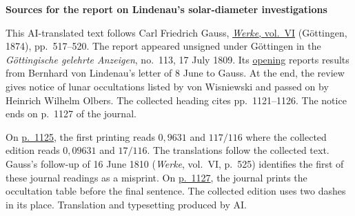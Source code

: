 \clearpage\thispagestyle{empty}
\begin{center}\textbf{Sources for the report on Lindenau’s solar-diameter investigations}\end{center}
\noindent This AI-translated text follows Carl Friedrich Gauss, \href{https://gdz.sub.uni-goettingen.de/id/PPN236007467}{\emph{Werke}, vol.~VI} (Göttingen, 1874), pp.~517–520. The report appeared unsigned under Göttingen in the \emph{Göttingische gelehrte Anzeigen}, no.~113, 17 July 1809. Its \href{https://images.p.sub.uni-goettingen.de/iiif/image/gdz:PPN319721507_1809:00001125/full/1650,/0/default.jpg}{opening} reports results from Bernhard von Lindenau’s letter of 8 June to Gauss. At the end, the review gives notice of lunar occultations listed by von Wisniewski and passed on by Heinrich Wilhelm Olbers. The collected heading cites pp.~1121–1126. The notice ends on p.~1127 of the journal.
\par\smallskip\noindent On \href{https://images.p.sub.uni-goettingen.de/iiif/image/gdz:PPN319721507_1809:00001129/full/1650,/0/default.jpg}{p.~1125}, the first printing reads $0{,}9631$ and $117/116$ where the collected edition reads $0{,}09631$ and $17/116$. The translations follow the collected text. Gauss’s follow-up of 16 June 1810 (\emph{Werke}, vol.~VI, p.~525) identifies the first of these journal readings as a misprint. On \href{https://images.p.sub.uni-goettingen.de/iiif/image/gdz:PPN319721507_1809:00001131/full/1650,/0/default.jpg}{p.~1127}, the journal prints the occultation table before the final sentence. The collected edition uses two dashes in its place. Translation and typesetting produced by AI.
\clearpage
